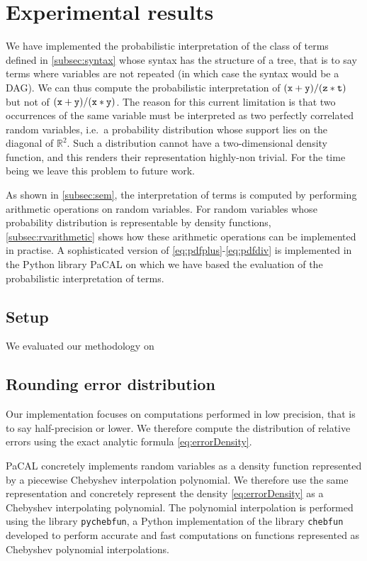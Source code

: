\documentclass[10pt,conference]{IEEEtran}
\newcommand{\ie}{i.e.\ }
\newcommand{\R}{\mathbb{R}}
\begin{document}
\section{Experimental results}\label{sec:exp}

We have implemented the probabilistic interpretation of the class of terms defined in \cref{subsec:syntax} whose syntax has the structure of a tree, that is to say terms where variables are not repeated (in which case the syntax would be a DAG). We can thus compute the probabilistic interpretation of $\tt (x+y)/(z\ast t)$ but not of $\tt (x+y)/(x\ast y)$. The reason for this current limitation is that two occurrences of the same variable must be interpreted as two perfectly correlated random variables, \ie a probability distribution whose support lies on the diagonal of $\R^2$. Such a distribution cannot have a two-dimensional density function, and this renders their representation highly-non trivial. For the time being we leave this problem to future work.

As shown in \cref{subsec:sem}, the interpretation of terms is computed by performing arithmetic operations on random variables. For random variables whose probability distribution is representable by density functions, \cref{subsec:rvarithmetic} shows how these arithmetic operations can be implemented in practise. A sophisticated version of \cref{eq:pdfplus}-\cref{eq:pdfdiv} is implemented in the Python library PaCAL
\cite{jaroszewicz2012arithmetic}\cite{korzen2014pacal} on which we have based the evaluation of the probabilistic interpretation of terms.

\subsection{Setup}
We evaluated our methodology on  

\subsection{Rounding error distribution}
Our implementation focuses on computations performed in low precision, that is to say half-precision or lower. We therefore compute the distribution of relative errors using the exact analytic formula \cref{eq:errorDensity}.

PaCAL concretely implements random variables as a density function represented by a piecewise Chebyshev interpolation polynomial. We therefore use the same representation and concretely represent the density \cref{eq:errorDensity} as a Chebyshev interpolating polynomial. The polynomial interpolation is performed using the library \texttt{pychebfun}, a Python implementation of the library \texttt{chebfun} \cite{battles2004extension} developed to perform accurate and fast computations on functions represented as Chebyshev polynomial interpolations.
\end{document}
